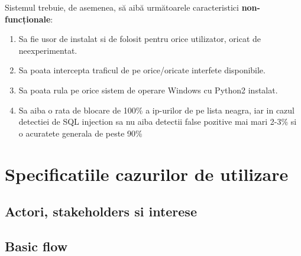 Sistemul trebuie, de asemenea, să aibă următoarele caracteristici \textbf{non-funcționale}:
\begin{enumerate}
	\item Sa fie usor de instalat si de folosit pentru orice utilizator, oricat de neexperimentat.
	\item Sa poata intercepta traficul de pe orice/oricate interfete disponibile.
	\item Sa poata rula pe orice sistem de operare Windows cu Python2 instalat.
	\item Sa aiba o rata de blocare de 100\% a ip-urilor de pe lista neagra, iar
	in cazul detectiei de SQL injection sa nu aiba detectii false pozitive mai mari 2-3\%
	si o acuratete generala de peste 90\%
\end{enumerate}
\newpage

\section{Specificatiile cazurilor de utilizare}

\subsection{Actori, stakeholders si interese}

\subsection{Basic flow}
